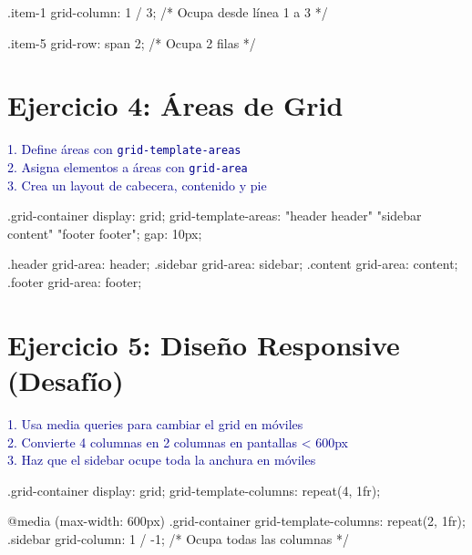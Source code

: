 \documentclass[12pt, a4paper]{article}
\newcommand{\enunciado}[1]{
    \vspace{0.5em}
    \noindent\colorbox{blue!10}{
        \parbox{\dimexpr\textwidth-2\fboxsep}{
            \small\sffamily\textcolor{darkblue}{#1}
        }
    }
    \vspace{0.5em}
}
\begin{document}
\begin{codebox}[title=CSS]
.item-1 {
    grid-column: 1 / 3;  /* Ocupa desde línea 1 a 3 */
}

.item-5 {
    grid-row: span 2;    /* Ocupa 2 filas */
}
\end{codebox}

\section*{Ejercicio 4: Áreas de Grid}
\enunciado{
    1. Define áreas con \texttt{grid-template-areas} \\
    2. Asigna elementos a áreas con \texttt{grid-area} \\
    3. Crea un layout de cabecera, contenido y pie
}

\begin{codebox}[title=CSS]
.grid-container {
    display: grid;
    grid-template-areas:
        "header header"
        "sidebar content"
        "footer footer";
    gap: 10px;
}

.header { grid-area: header; }
.sidebar { grid-area: sidebar; }
.content { grid-area: content; }
.footer { grid-area: footer; }
\end{codebox}

\section*{Ejercicio 5: Diseño Responsive (Desafío)}
\enunciado{
    1. Usa media queries para cambiar el grid en móviles \\
    2. Convierte 4 columnas en 2 columnas en pantallas < 600px \\
    3. Haz que el sidebar ocupe toda la anchura en móviles
}

\begin{codebox}[title=CSS]
.grid-container {
    display: grid;
    grid-template-columns: repeat(4, 1fr);
}

@media (max-width: 600px) {
    .grid-container {
        grid-template-columns: repeat(2, 1fr);
    }
    .sidebar {
        grid-column: 1 / -1; /* Ocupa todas las columnas */
    }
}
\end{codebox}
\end{document}
